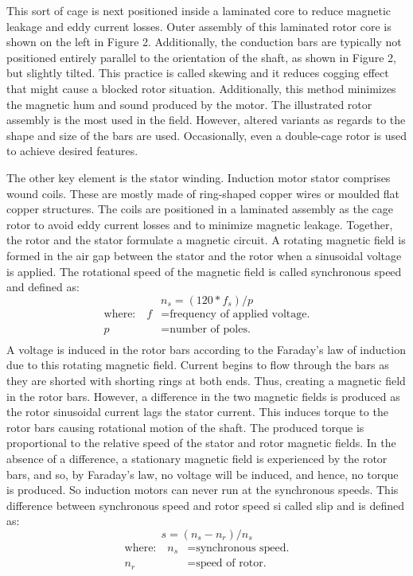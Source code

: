 This sort of cage is next positioned inside a laminated core to reduce magnetic leakage and eddy current losses. Outer assembly of this laminated rotor core is shown on the left in Figure 2. Additionally, the conduction bars are typically not positioned entirely parallel to the orientation of the shaft, as shown in Figure 2, but slightly tilted. This practice is called skewing and it reduces cogging effect that might cause a blocked rotor situation. Additionally, this method minimizes the magnetic hum and sound produced by the motor. The illustrated rotor assembly is the most used in the field. However, altered variants as regards to the shape and size of the bars are used. Occasionally, even a double-cage rotor is used to achieve desired features. 

The other key element is the stator winding. Induction motor stator comprises wound coils. These are mostly made of ring-shaped copper wires or moulded flat copper structures. The coils are positioned in a laminated assembly as the cage rotor to avoid eddy current losses and to minimize magnetic leakage. Together, the rotor and the stator formulate a magnetic circuit. A rotating magnetic field is formed in the air gap between the stator and the rotor when a sinusoidal voltage is applied. The rotational speed of the magnetic field is called synchronous speed and defined as:
\begin{equation}
	n_s=(120*f_s)/p
\end{equation}
\begin{align*}
	\text{where:}\quad
	 f    &=  \text{frequency of applied voltage.} \\
	 p    &=  \text{number of poles.} \\
\end{align*}
A voltage is induced in the rotor bars according to the Faraday's law of induction due to this rotating magnetic field. Current begins to flow through the bars as they are shorted with shorting rings at both ends. Thus, creating a magnetic field in the rotor bars. However, a difference in the two magnetic fields is produced as the rotor sinusoidal current lags the stator current. This induces torque to the rotor bars causing rotational motion of the shaft.
The produced torque is proportional to the relative speed of the stator and rotor magnetic fields. In the absence of a difference, a stationary magnetic field is experienced by the rotor bars, and so, by Faraday’s law, no voltage will be induced, and hence, no torque is produced. So induction motors can never run at the synchronous speeds. This difference between synchronous speed and rotor speed si called slip and is defined as:
\begin{equation}
	s=(n_s-n_r)/n_s
\end{equation}
\begin{align*}
	\text{where:}\quad
	 n_s    &=  \text{synchronous speed.} \\
	 n_r    &=  \text{speed of rotor.} \\
\end{align*}

